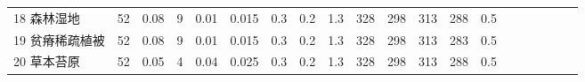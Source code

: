 \begin{sidewaystable}[]
\begin{tabular}{@{}lccccccccccccccccccc@{}}
    18 森林湿地    & 52                                                                & 0.08                                                                                                   & 9                                                                                  & 0.01                                                                               & 0.015                                                               & 0.3                                                       & 0.2                                                       & 1.3                                                       & 328                                                             & 298                                                             & 313                                                              & 288                                                               & 0.5                                                          \\
    19 贫瘠稀疏植被  & 52                                                                & 0.08                                                                                                   & 9                                                                                  & 0.01                                                                               & 0.015                                                               & 0.3                                                       & 0.2                                                       & 1.3                                                       & 328                                                             & 298                                                             & 313                                                              & 283                                                               & 0.5                                                          \\
    20 草本苔原    & 52                                                                & 0.05                                                                                                   & 4                                                                                  & 0.04                                                                               & 0.025                                                               & 0.3                                                       & 0.2                                                       & 1.3                                                       & 328                                                             & 298                                                             & 313                                                              & 288                                                               & 0.5                                                          \\

\end{tabular}
\end{sidewaystable}
